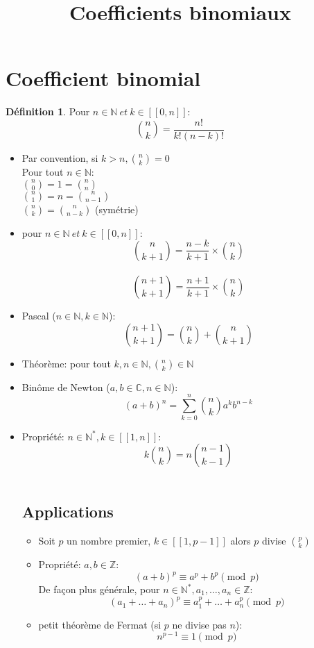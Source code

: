 \documentclass[fleqn]{article}
\title{Coefficients binomiaux}
\date{}
\theoremstyle{definition} \newtheorem*{defi}{D\'efinition}
\theoremstyle{definition} \newtheorem*{theo}{Th\'eor\`eme}
\begin{document}
\maketitle

\section{Coefficient binomial}
\begin{defi}
	Pour \(n \in \mathbb{N}\ et\ k \in [\![0,n]\!]\): \\
	\[ \binom{n}{k} = \frac{n!}{k!(n-k)!} \]
\end{defi}
\begin{itemize}
		\item Par convention, si \(k>n, \binom{n}{k} = 0\) \\
		Pour tout \(n \in \mathbb{N}:\) \\
		\(\binom{n}{0} = 1 = \binom{n}{n}\) \\
		\(\binom{n}{1} = n = \binom{n}{n-1}\) \\
		\(\binom{n}{k} = \binom{n}{n-k}\) (sym\'etrie)
	\item pour \(n \in \mathbb{N}\ et\ k \in [\![0,n]\!]\): \\
		\[\binom{n}{k+1} = \frac{n-k}{k+1} \times \binom{n}{k} \] \\
		\[\binom{n+1}{k+1} = \frac{n+1}{k+1} \times \binom{n}{k} \]
	\item Pascal (\(n \in \mathbb{N}, k \in \mathbb{N}\)): \\
		\[\binom{n+1}{k+1} = \binom{n}{k} + \binom{n}{k+1}\]
	\item Th\'{e}or\`{e}me: pour tout \(k,n \in \mathbb{N}, \binom{n}{k} \in \mathbb{N}\) \\
	\item Bin\^{o}me de Newton (\(a,b \in \mathbb{C}, n \in \mathbb{N}\)): \\
		\[(a+b)^n = \sum_{k=0}^{n} \binom{n}{k}a^kb^{n-k}\]
	\item Propri\'{e}t\'{e}: \(n \in \mathbb{N}^*, k \in [\![1,n]\!]\): \\
		\[k\binom{n}{k} = n\binom{n-1}{k-1}\] \\
	\subsection{Applications}
	\begin{itemize}
		\item Soit \(p\) un nombre premier, \(k \in [\![1,p-1]\!]\) alors \(p\) divise \(\binom{p}{k}\) \\
		\item Propri\'{e}t\'{e}: \(a,b \in \mathbb{Z}\): \\
			\[(a+b)^p \equiv a^p + b^p \pmod{p}\]
			De fa\c{c}on plus g\'en\'erale, pour \(n \in \mathbb{N}^*, a_1, \hdots, a_n \in \mathbb{Z}\): \\
			\[(a_1+\hdots+a_n)^p \equiv a_1^p+\hdots+a_n^p \pmod{p}\]
		\item petit th\'eor\`eme de Fermat (si \(p\) ne divise pas \(n\)): \\
			\[n^{p-1} \equiv 1\pmod{p} \]
	\end{itemize}
\end{itemize}
\end{document}
